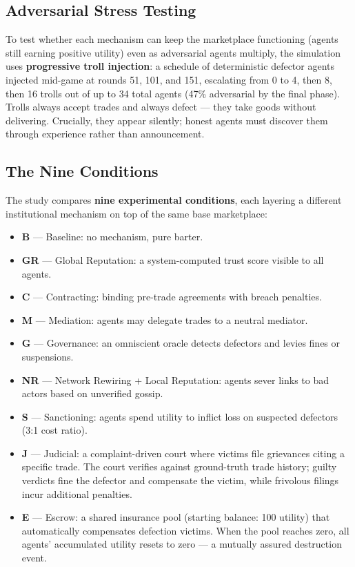 \documentclass[12pt,a4paper]{article}
\begin{document}
\subsection*{Adversarial Stress Testing}

To test whether each mechanism can keep the marketplace functioning (agents still earning positive utility) even as adversarial agents multiply, the simulation uses \textbf{progressive troll injection}: a schedule of deterministic defector agents injected mid-game at rounds 51, 101, and 151, escalating from 0 to 4, then 8, then 16 trolls out of up to 34 total agents (47\% adversarial by the final phase). Trolls always accept trades and always defect --- they take goods without delivering. Crucially, they appear silently; honest agents must discover them through experience rather than announcement.

\subsection*{The Nine Conditions}

The study compares \textbf{nine experimental conditions}, each layering a different institutional mechanism on top of the same base marketplace:

\begin{itemize}
    \item \textbf{B} --- Baseline: no mechanism, pure barter.
    \item \textbf{GR} --- Global Reputation: a system-computed trust score visible to all agents.
    \item \textbf{C} --- Contracting: binding pre-trade agreements with breach penalties.
    \item \textbf{M} --- Mediation: agents may delegate trades to a neutral mediator.
    \item \textbf{G} --- Governance: an omniscient oracle detects defectors and levies fines or suspensions.
    \item \textbf{NR} --- Network Rewiring + Local Reputation: agents sever links to bad actors based on unverified gossip.
    \item \textbf{S} --- Sanctioning: agents spend utility to inflict loss on suspected defectors (3:1 cost ratio).
    \item \textbf{J} --- Judicial: a complaint-driven court where victims file grievances citing a specific trade. The court verifies against ground-truth trade history; guilty verdicts fine the defector and compensate the victim, while frivolous filings incur additional penalties.
    \item \textbf{E} --- Escrow: a shared insurance pool (starting balance: 100 utility) that automatically compensates defection victims. When the pool reaches zero, all agents' accumulated utility resets to zero --- a mutually assured destruction event.
\end{itemize}
\end{document}
